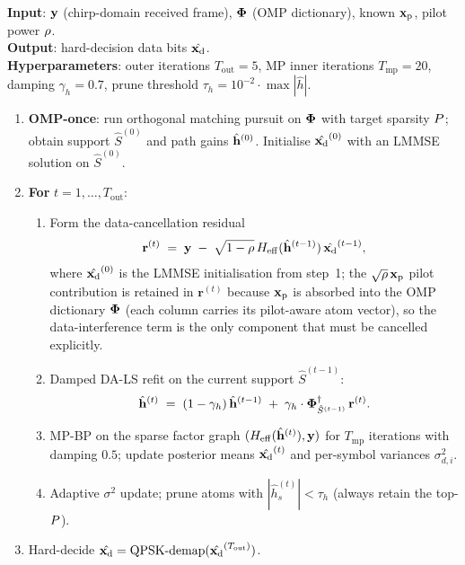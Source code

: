\begin{algorithm}[t]
\caption{Classical joint OMP-once + iterative LS/MP-BP receiver.}
\label{alg:joint}
\begin{small}
\textbf{Input}: $\mathbf{y}$ (chirp-domain received frame), $\boldsymbol{\Phi}$ (OMP dictionary), known $\mathbf{x}_{\mathrm{p}}$, pilot power $\rho$. \\
\textbf{Output}: hard-decision data bits $\hat{\mathbf{x}_{\mathrm{d}}}$. \\
\textbf{Hyperparameters}: outer iterations $T_\text{out} = 5$, MP inner iterations $T_\text{mp} = 20$, damping $\gamma_h = 0.7$, prune threshold $\tau_h = 10^{-2}\cdot \max |\hat{h}|$.
\begin{enumerate}[leftmargin=*,itemsep=1pt,topsep=2pt]
  \item \textbf{OMP-once}: run orthogonal matching pursuit on $\boldsymbol{\Phi}$ with target sparsity $P$; obtain support $\hat{S}^{(0)}$ and path gains $\hat{\mathbf{h}}^{(0)}$. Initialise $\hat{\mathbf{x}_{\mathrm{d}}}^{(0)}$ with an LMMSE solution on $\hat{S}^{(0)}$.
  \item \textbf{For} $t = 1, \dots, T_\text{out}$:
  \begin{enumerate}[leftmargin=*,itemsep=1pt,topsep=2pt]
    \item Form the data-cancellation residual
    \begin{equation}
    \mathbf{r}^{(t)} \;=\; \mathbf{y} \;-\; \sqrt{1-\rho}\, H_{\mathrm{eff}}(\hat{\mathbf{h}}^{(t-1)})\, \hat{\mathbf{x}_{\mathrm{d}}}^{(t-1)},
    \label{eq:dals_resid}
    \end{equation}
    where $\hat{\mathbf{x}_{\mathrm{d}}}^{(0)}$ is the LMMSE initialisation from step~1; the $\sqrt{\rho}\,\mathbf{x}_{\mathrm{p}}$ pilot contribution is retained in $\mathbf{r}^{(t)}$ because $\mathbf{x}_{\mathrm{p}}$ is absorbed into the OMP dictionary $\boldsymbol{\Phi}$ (each column carries its pilot-aware atom vector), so the data-interference term is the only component that must be cancelled explicitly.
    \item Damped DA-LS refit on the current support $\hat{S}^{(t-1)}$:
    \begin{equation}
    \hat{\mathbf{h}}^{(t)} \;=\; (1-\gamma_h)\,\hat{\mathbf{h}}^{(t-1)} \;+\; \gamma_h \cdot \boldsymbol{\Phi}_{\hat{S}^{(t-1)}}^{\dagger}\, \mathbf{r}^{(t)}.
    \label{eq:dals}
    \end{equation}
    \item MP-BP on the sparse factor graph $(H_{\mathrm{eff}}(\hat{\mathbf{h}}^{(t)}), \mathbf{y})$ for $T_\text{mp}$ iterations with damping $0.5$; update posterior means $\hat{\mathbf{x}_{\mathrm{d}}}^{(t)}$ and per-symbol variances $\sigma_{d,i}^2$.
    \item Adaptive $\sigma^2$ update; prune atoms with $|\hat{h}_s^{(t)}| < \tau_h$ (always retain the top-$P$).
  \end{enumerate}
  \item Hard-decide $\hat{\mathbf{x}_{\mathrm{d}}} = \mathrm{QPSK\text{-}demap}(\hat{\mathbf{x}_{\mathrm{d}}}^{(T_\text{out})})$.
\end{enumerate}
\end{small}
\end{algorithm}


